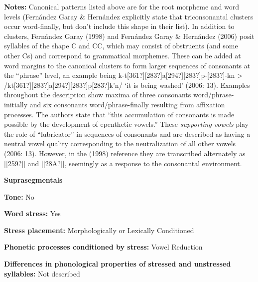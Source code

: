 \begin{styleBody}
\textbf{Notes:} Canonical patterns listed above are for the root morpheme and word levels (Fernández Garay \& Hernández explicitly state that triconsonantal clusters occur word-finally, but don’t include this shape in their list). In addition to clusters, Fernández Garay (1998) and Fernández Garay \& Hernández (2006) posit syllables of the shape C and CC, which may consist of obstruents (and some other Cs) and correspond to grammatical morphemes. These can be added at word margins to the canonical clusters to form larger sequences of consonants at the “phrase” level, an example being k{}-t[361?][283?]a[294?][283?]p{}-[283?]{}-kn {\textgreater} /kt[361?][283?]a[294?][283?]p[283?]k’n/ ‘it is being washed’ (2006: 13). Examples throughout the description show maxima of three consonants word/phrase-initially and six consonants word/phrase-finally resulting from affixation processes. The authors state that “this accumulation of consonants is made possible by the development of epenthetic vowels.” These \textit{supporting vowels} play the role of “lubricator” in sequences of consonants and are described as having a neutral vowel quality corresponding to the neutralization of all other vowels (2006: 13). However, in the (1998) reference they are transcribed alternately as [[259?]] and [[28A?]], seemingly as a response to the consonantal environment.
\end{styleBody}

\begin{styleBody}
\textbf{Suprasegmentals}
\end{styleBody}

\begin{styleBody}
\textbf{Tone:} No
\end{styleBody}

\begin{styleBody}
\textbf{Word stress:} Yes
\end{styleBody}

\begin{styleBody}
\textbf{Stress placement:} Morphologically or Lexically Conditioned
\end{styleBody}

\begin{styleBody}
\textbf{Phonetic processes conditioned by stress:} Vowel Reduction
\end{styleBody}

\begin{styleBody}
\textbf{Differences in phonological properties of stressed and unstressed syllables:} Not described
\end{styleBody}

